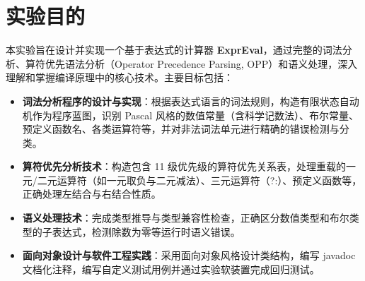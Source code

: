 

\chapter{实验目的}
本实验旨在设计并实现一个基于表达式的计算器 \textbf{ExprEval}，通过完整的词法分析、算符优先语法分析（Operator Precedence Parsing, OPP）和语义处理，深入理解和掌握编译原理中的核心技术。主要目标包括：
\begin{itemize}
  \item \textbf{词法分析程序的设计与实现}：根据表达式语言的词法规则，构造有限状态自动机作为程序蓝图，识别 Pascal 风格的数值常量（含科学记数法）、布尔常量、预定义函数名、各类运算符等，并对非法词法单元进行精确的错误检测与分类。
  \item \textbf{算符优先分析技术}：构造包含 11 级优先级的算符优先关系表，处理重载的一元/二元运算符（如一元取负与二元减法）、三元运算符（?:）、预定义函数等，正确处理左结合与右结合性质。
  \item \textbf{语义处理技术}：完成类型推导与类型兼容性检查，正确区分数值类型和布尔类型的子表达式，检测除数为零等运行时语义错误。
  \item \textbf{面向对象设计与软件工程实践}：采用面向对象风格设计类结构，编写 javadoc 文档化注释，编写自定义测试用例并通过实验软装置完成回归测试。
\end{itemize}


